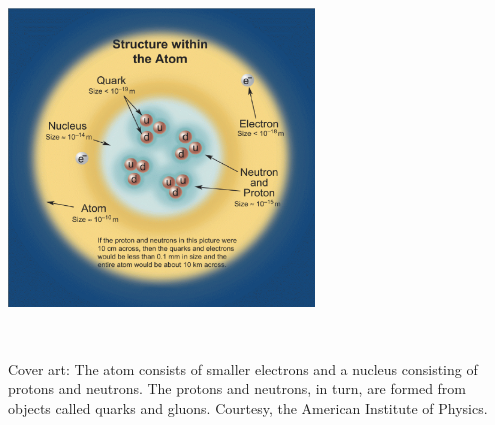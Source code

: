 \begin{center}

\includegraphics[width=3.2in]{AtomicStructure.ps}

\end{center}

\thispagestyle{empty}

\newpage


\ 
\setcounter{page}{2}

\vfill

Cover art: The atom consists of smaller electrons and a nucleus consisting of protons and neutrons. The protons and neutrons, in turn, are formed from objects called quarks and gluons. Courtesy, the American Institute of Physics.

\pagebreak
